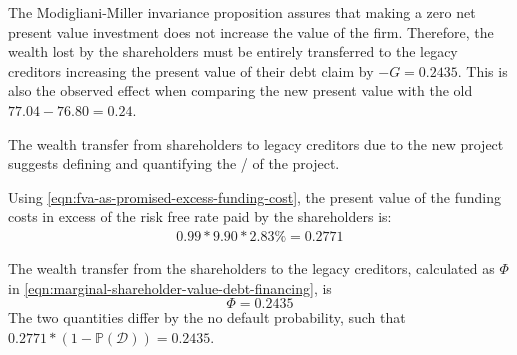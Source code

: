 \documentclass[main.tex]{subfiles}
\begin{document}
        The Modigliani-Miller invariance proposition assures that making a zero net present value investment 
        does not increase the value of the firm.
        Therefore, the wealth lost by the shareholders must be entirely transferred to the legacy creditors 
        increasing the present value of their debt claim by $-G = 0.2435$. 
        This is also the observed effect when comparing the new present value with the old 
        $77.04 - 76.80 = 0.24$.

        The wealth transfer from shareholders to legacy creditors due to the new project 
        suggests defining and quantifying the \FVA/ of the project. 

        Using \cref{eqn:fva-as-promised-excess-funding-cost}, the present value of the funding costs 
        in excess of the risk free rate paid by the shareholders is: 
        \begin{align}
            0.99 * 9.90 * 2.83\% = 0.2771
        \end{align}

        The wealth transfer from the shareholders to the legacy creditors, 
        calculated as $\Phi$ in \cref{eqn:marginal-shareholder-value-debt-financing}, is
        \begin{equation}
            \Phi = 0.2435
        \end{equation}
        The two quantities differ by the no default probability, such that 
        $0.2771 * (1-\mathbb{P}\left(\mathcal{D}\right)) = 0.2435$.
\end{document}

